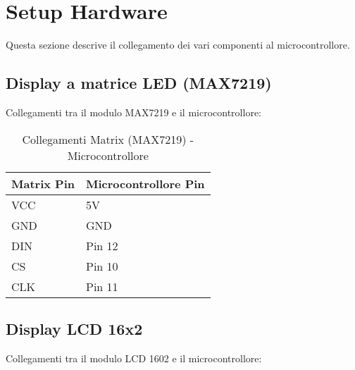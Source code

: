 \documentclass[a4paper, 12pt]{article}
\begin{document}
\section{Setup Hardware}
\label{sec:setup}
Questa sezione descrive il collegamento dei vari componenti al microcontrollore.

\subsection{Display a matrice LED (MAX7219)}
\label{subsec:setup-max7219}
Collegamenti tra il modulo MAX7219 e il microcontrollore:

\begin{table}[H]
    \centering
    \caption{Collegamenti Matrix (MAX7219) - Microcontrollore}
    \label{tab:matrix-max7219-connections}
    \begin{tabular}{ll}
        \toprule
        \textbf{Matrix Pin} & \textbf{Microcontrollore Pin} \\
        \midrule
        VCC                 & 5V                            \\
        GND                 & GND                           \\
        DIN                 & Pin 12                        \\
        CS                  & Pin 10                        \\
        CLK                 & Pin 11                        \\
        \bottomrule
    \end{tabular}
\end{table}

\subsection{Display LCD 16x2}
\label{subsec:setup-lcd}
Collegamenti tra il modulo LCD 1602 e il microcontrollore:
\end{document}
